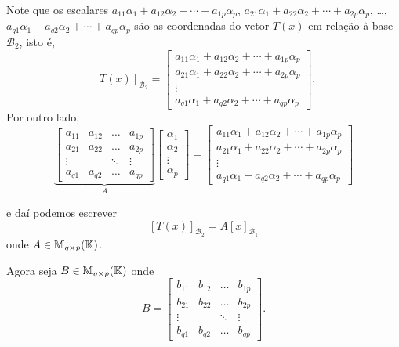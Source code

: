 Note que os escalares $a_{11}\alpha_1 + a_{12}\alpha_2 + \cdots + a_{1p}\alpha_p$, $a_{21}\alpha_1 + a_{22}\alpha_2 + \cdots + a_{2p}\alpha_p$, \dots, $a_{q1}\alpha_1 + a_{q2}\alpha_2 + \cdots + a_{qp}\alpha_p$ são as coordenadas do vetor $T(x)$ em relação \`a base $\mathcal{B}_2$, isto é,
\[
    [T(x)]_{\mathcal{B}_2} = \begin{bmatrix}
    a_{11}\alpha_1 + a_{12}\alpha_2 + \cdots + a_{1p}\alpha_p\\
    a_{21}\alpha_1 + a_{22}\alpha_2 + \cdots + a_{2p}\alpha_p\\
    \vdots\\
    a_{q1}\alpha_1 + a_{q2}\alpha_2 + \cdots + a_{qp}\alpha_p
    \end{bmatrix}.
\]
Por outro lado,
\[
    \underbrace{\begin{bmatrix}
    a_{11} & a_{12} & \dots & a_{1p}\\
    a_{21} & a_{22} & \dots & a_{2p}\\
    \vdots & & \ddots & \vdots\\
    a_{q1} & a_{q2} & \dots & a_{qp}
    \end{bmatrix}}_{A}\begin{bmatrix}
    \alpha_1\\
    \alpha_2\\
    \vdots\\
    \alpha_p
    \end{bmatrix} = \begin{bmatrix}
    a_{11}\alpha_1 + a_{12}\alpha_2 + \cdots + a_{1p}\alpha_p\\
    a_{21}\alpha_1 + a_{22}\alpha_2 + \cdots + a_{2p}\alpha_p\\
    \vdots \\
    a_{q1}\alpha_1 + a_{q2}\alpha_2 + \cdots + a_{qp}\alpha_p
    \end{bmatrix}
\]

e daí podemos escrever
\[
    [T(x)]_{\mathcal{B}_2} = A[x]_{\mathcal{B}_1}
\]
onde $A \in \mathbb{M}_{q\times p}(\mathbb{K})$.

Agora seja $B \in \mathbb{M}_{q\times p}(\mathbb{K})$ onde
\[
    B = \begin{bmatrix}
    b_{11} & b_{12} & \dots & b_{1p}\\
    b_{21} & b_{22} & \dots & b_{2p}\\
    \vdots & & \ddots & \vdots\\
    b_{q1} & b_{q2} & \dots & b_{qp}
    \end{bmatrix}.
\]

